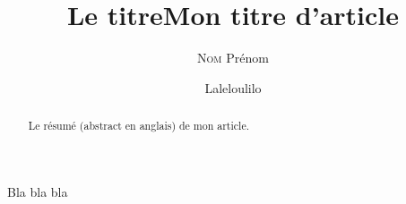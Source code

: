 \documentclass[a4paper,10pt]{report}
\title{Le titre}
\author{\textsc{Nom} Prénom}
\date{} %
\title{Mon titre d'article}
\date{}
\author{Laleloulilo}
\begin{document}
	
\maketitle

\begin{abstract}
Le résumé (abstract en anglais) de mon article.
\end{abstract}


\tableofcontents


Bla bla bla

\listoffigures
\listoftables
\printindex
\end{document}
